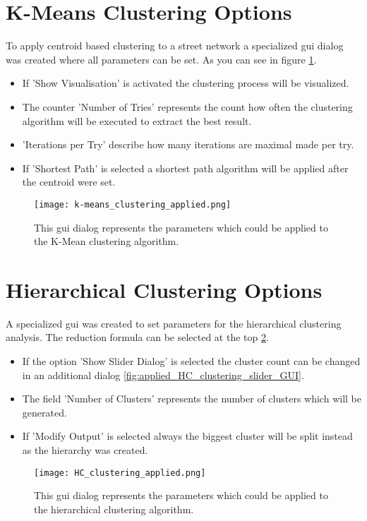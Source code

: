\section{K-Means Clustering Options} \label{sec:k-means_clustering_options}
To apply centroid based clustering to a street network a specialized gui dialog was created where all parameters can be set. As you can see in figure \ref{fig:applied_k-means_GUI}.
\begin{itemize}
    \item If 'Show Visualisation' is activated the clustering process will be visualized.
    \item The counter 'Number of Tries' represents the count how often the clustering algorithm will be executed to extract the best result.
    \item 'Iterations per Try' describe how many iterations are maximal made per try. 
    \item If 'Shortest Path' is selected a shortest path algorithm will be applied after the centroid were set.
\end{itemize}
\begin{figure}[ht]
    \centering
    \texttt{[image: k-means\_clustering\_applied.png]}
    \caption{This gui dialog represents the parameters which could be applied to the K-Mean clustering algorithm.}
    \label{fig:applied_k-means_GUI}
\end{figure}

\pagebreak
\section{Hierarchical Clustering Options} \label{sec:hierarchical_clustering_options}
A specialized gui was created to set parameters for the hierarchical clustering analysis. The reduction formula can be selected at the top \ref{fig:applied_HC_clustering_GUI}.
\begin{itemize}
    \item If the option 'Show Slider Dialog' is selected the cluster count can be changed in an additional dialog \ref{fig:applied_HC_clustering_slider_GUI}.
    \item The field 'Number of Clusters' represents the number of clusters which will be generated.
    \item If 'Modify Output' is selected always the biggest cluster will be split instead as the hierarchy was created.
\end{itemize}

\begin{figure}[ht]
    \centering
    \texttt{[image: HC\_clustering\_applied.png]}
    \caption{This gui dialog represents the parameters which could be applied to the hierarchical clustering algorithm.}
    \label{fig:applied_HC_clustering_GUI}
\end{figure}

